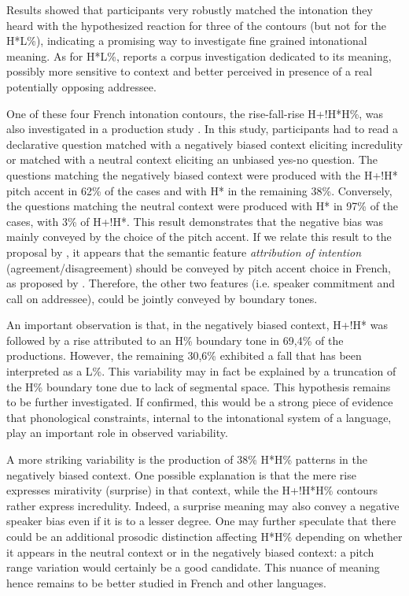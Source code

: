\documentclass[output=paper,colorlinks,citecolor=brown]{langscibook}
\begin{document}
Results showed that participants very robustly matched the intonation they heard with the hypothesized reaction for three of the contours (but not for the H*L\%), indicating a promising way to investigate fine grained intonational meaning. As for H*L\%, \citet{portesryle2014} reports a corpus investigation dedicated to its meaning, possibly more sensitive to context and better perceived in presence of a real potentially opposing addressee.

One of these four French intonation contours, the rise-fall-rise H+!H*H\%, was also investigated in a production study \citep{MiPorCham-Lav2016}. In this study, participants had to read a declarative question matched with a negatively biased context eliciting incredulity or matched with a neutral context eliciting an unbiased yes-no question. The questions matching the negatively biased context were produced with the H+!H* pitch accent in 62\% of the cases and with H* in the remaining 38\%. Conversely, the questions matching the neutral context were produced with H* in 97\% of the cases, with 3\% of H+!H*. This result demonstrates that the negative bias was mainly conveyed by the choice of the pitch accent. If we relate this result to the proposal by \citet{portesetal2014}, it appears that the semantic feature \textit{attribution of intention} (agreement/disagreement) should be conveyed by pitch accent choice in French, as proposed by \citet{Portes2015IsIM}. Therefore, the other two features (i.e. speaker commitment and call on addressee), could be jointly conveyed by boundary tones.

\largerpage
An important observation is that, in the negatively biased context, H+!H* was followed by a rise attributed to an H\% boundary tone in 69,4\% of the productions. However, the remaining 30,6\% exhibited a fall that has been interpreted as a L\%. This variability may in fact be explained by a truncation of the H\% boundary tone due to lack of segmental space. This hypothesis remains to be further investigated. If confirmed, this would be a strong piece of evidence that phonological constraints, internal to the intonational system of a language, play an important role in observed variability.

A more striking variability is the production of 38\% H*H\% patterns in the negatively biased context. One possible explanation is that the mere rise expresses mirativity (surprise) in that context, while the H+!H*H\% contours rather express incredulity. Indeed, a surprise meaning may also convey a negative speaker bias even if it is to a lesser degree. One may further speculate that there could be an additional prosodic distinction affecting H*H\% depending on whether it appears in the neutral context or in the negatively biased context: a pitch range variation would certainly be a good candidate. This nuance of meaning hence remains to be better studied in French and other languages.
\end{document}
